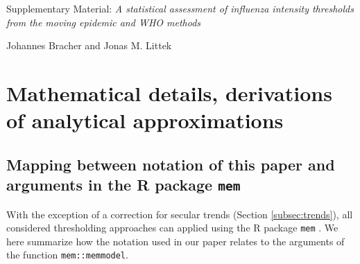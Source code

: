 \documentclass[12pt]{article}
\begin{document}
{\footnotesize


}

\newpage
\appendix


\renewcommand{\thepage}{S\arabic{page}}
\renewcommand{\thesection}{S\arabic{section}}
\renewcommand{\thetable}{S\arabic{table}}
\renewcommand{\thefigure}{S\arabic{figure}}
\setcounter{page}{1}
\setcounter{section}{0}
\setcounter{table}{0}
\setcounter{figure}{0}

\begin{center}
{\LARGE Supplementary Material: \textit{A statistical assessment of influenza intensity thresholds from the moving epidemic and WHO methods}}

\medskip

{\large Johannes Bracher and Jonas M. Littek}
\end{center}

\renewcommand{\thepage}{S\arabic{page}}
\renewcommand{\thesection}{\Alph{section}}
\renewcommand{\thetable}{S\arabic{table}}
\renewcommand\thefigure{S\arabic{figure}}
\renewcommand\theequation{S\arabic{equation}}

\setcounter{figure}{0}
\setcounter{table}{0}
\setcounter{equation}{0}



\section{Mathematical details, derivations of analytical approximations}
\label{appendix:derivations}

\subsection{Mapping  between notation of this paper and arguments in the R package \texttt{mem}}
\label{suppl:mapping}

With the exception of a correction for secular trends (Section \ref{subsec:trends}), all considered thresholding approaches can applied using the R package \texttt{mem} \citep{Lozano2020}. We here summarize how the notation used in our paper relates to the arguments of the function \texttt{mem::memmodel}.
\end{document}
